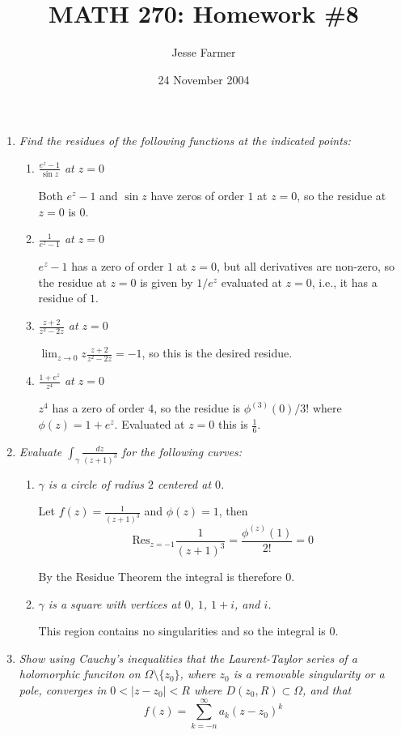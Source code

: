 \documentclass[letterpaper, 11pt]{article}
\title{MATH 270: Homework \#8}
\author{Jesse Farmer}
\date{24 November 2004}
\newcommand{\Res}{\text{Res}}
\begin{document}
\maketitle
\begin{enumerate}

\item \emph{Find the residues of the following functions at the indicated points:}
\begin{enumerate}
\item \emph{$\frac{e^z-1}{\sin z}$ at $z = 0$}

Both $e^z-1$ and $\sin z$ have zeros of order $1$ at $z=0$, so the residue at $z=0$ is $0$.

\item \emph{$\frac{1}{e^z-1}$ at $z = 0$}

$e^z-1$ has a zero of order $1$ at $z=0$, but all derivatives are non-zero, so the residue at $z=0$ is given by $1/e^z$ evaluated at $z=0$, i.e., it has a residue of $1$.

\item \emph{$\frac{z+2}{z^2-2z}$ at $z = 0$}

$\lim_{z \rightarrow 0} z \frac{z+2}{z^2-2z} = -1$, so this is the desired residue.

\item \emph{$\frac{1+e^z}{z^4}$ at $z = 0$}

$z^4$ has a zero of order $4$, so the residue is $\phi^{(3)}(0)/3!$ where $\phi(z) = 1+e^z$.  Evaluated at $z=0$ this is $\frac{1}{6}$.
\end{enumerate}

\item \emph{Evaluate $\int_{\gamma} \frac{dz}{(z+1)^3}$ for the following curves:}
\begin{enumerate}
\item \emph{$\gamma$ is a circle of radius $2$ centered at $0$.}

Let $f(z) = \frac{1}{(z+1)^3}$ and $\phi(z) = 1$, then
\[
\Res_{z=-1} \frac{1}{(z+1)^3} = \frac{\phi^{(z)}(1)}{2!} = 0
\]

By the Residue Theorem the integral is therefore $0$.

\item \emph{$\gamma$ is a square with vertices at $0$, $1$, $1+i$, and $i$.}

This region contains no singularities and so the integral is $0$.
\end{enumerate}

\item \emph{Show using Cauchy's inequalities that the Laurent-Taylor series of a holomorphic funciton on $\Omega \setminus \{z_0\}$, where $z_0$ is a removable singularity or a pole, converges in $0 < |z - z_0| < R$ where $D(z_0, R) \subset \Omega$, and that $$f(z) = \sum_{k=-n}^\infty a_k(z-z_0)^k$$}


\end{enumerate}
\end{document}
